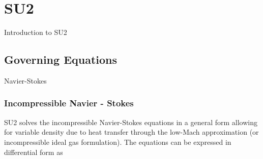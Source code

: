 \chapter{SU2}
Introduction to SU2

\section{Governing Equations}
Navier-Stokes

\subsection{Incompressible Navier - Stokes}

SU2 solves the incompressible Navier-Stokes equations in a general form allowing for variable density due to heat transfer through the low-Mach approximation (or incompressible ideal gas formulation). The equations can be expressed in differential form as 
\begin{equation}
	
\end{equation}